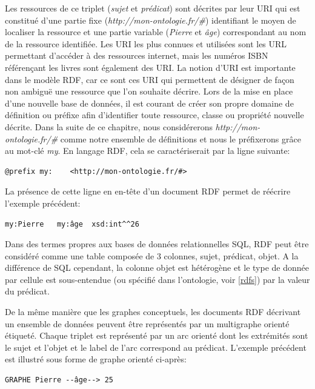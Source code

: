 Les ressources de ce triplet (\textit{sujet} et \textit{prédicat}) sont décrites par leur URI qui est constitué d'une partie fixe (\textit{http://mon-ontologie.fr/\#}) identifiant le moyen de localiser la ressource et une partie variable (\textit{Pierre} et \textit{âge}) correspondant au nom de la ressource identifiée. Les URI les plus connues et utilisées sont les URL permettant d'accéder à des ressources internet, mais les numéros ISBN référençant les livres sont également des URI. La notion d'URI est importante dans le modèle RDF, car ce sont ces URI qui permettent de désigner de façon non ambiguë une ressource que l'on souhaite décrire. Lors de la mise en place d'une nouvelle base de données, il est courant de créer son propre domaine de définition ou préfixe afin d'identifier toute ressource, classe ou propriété nouvelle décrite. Dans la suite de ce chapitre, nous considérerons \textit{http://mon-ontologie.fr/\#} comme notre ensemble de définitions et nous le préfixerons grâce au mot-clé \textit{my}. En langage RDF, cela se caractériserait par la ligne suivante:

\begin{lstlisting}
@prefix my:    <http://mon-ontologie.fr/#>
\end{lstlisting}

La présence de cette ligne en en-tête d'un document RDF permet de réécrire l'exemple précédent:

\begin{lstlisting}
my:Pierre   my:âge  xsd:int^^26
\end{lstlisting}

Dans des termes propres aux bases de données relationnelles SQL, RDF peut être considéré comme une table composée de 3 colonnes, sujet, prédicat, objet. A la différence de SQL cependant, la colonne objet est hétérogène et le type de donnée par cellule est sous-entendue (ou spécifié dans l'ontologie, voir \ref{rdfs}) par la valeur du prédicat.

De la même manière que les graphes conceptuels, les documents RDF décrivant un ensemble de données peuvent être représentés par un multigraphe orienté étiqueté. Chaque triplet est représenté par un arc orienté dont les extrémités sont le sujet et l'objet et le label de l'arc correspond au prédicat. L'exemple précédent est illustré sous forme de graphe orienté ci-après:

\begin{lstlisting}
GRAPHE Pierre --âge--> 25
\end{lstlisting}

